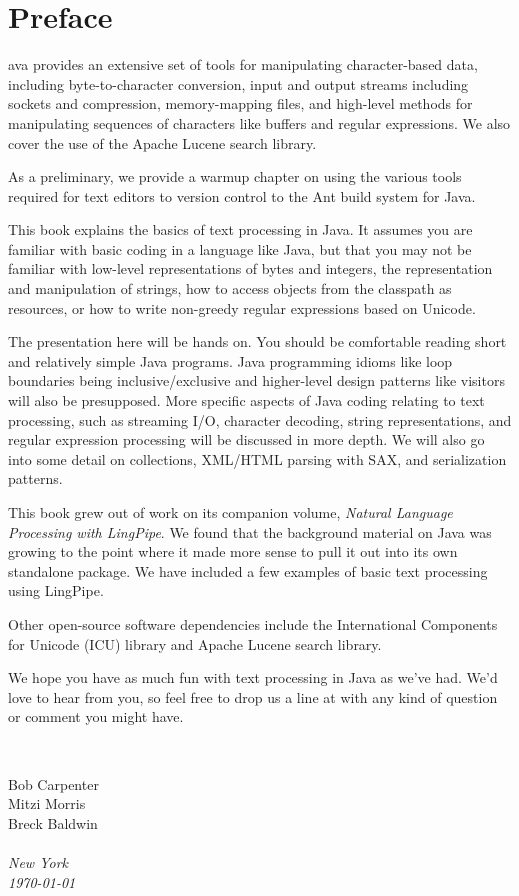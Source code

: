 \chapter*{Preface}
\pagestyle{fancy}%

ava provides an extensive set of tools for manipulating
character-based data, including byte-to-character conversion, input
and output streams including sockets and compression, memory-mapping
files, and high-level methods for manipulating sequences of characters
like buffers and regular expressions.  We also cover the use of the
Apache Lucene search library.

As a preliminary, we provide a warmup chapter on using the various
tools required for text editors to version control to the Ant build
system for Java.  

This book explains the basics of text processing in Java.  It 
assumes you are familiar with basic coding in a language like
Java, but that you may not be familiar with low-level representations
of bytes and integers, the representation and manipulation of
strings, how to access objects from the classpath as resources,
or how to write non-greedy regular expressions based on Unicode.

The presentation here will be hands on.  You should be comfortable
reading short and relatively simple Java programs.  Java programming idioms
like loop boundaries being inclusive/exclusive and higher-level design
patterns like visitors will also be presupposed.  More specific
aspects of Java coding relating to text processing, such as streaming
I/O, character decoding, string representations, and regular
expression processing will be discussed in more depth.  We will also
go into some detail on collections, XML/HTML parsing with SAX, and
serialization patterns.

This book grew out of work on its companion volume, {\it Natural
Language Processing with LingPipe}.  We found that the background material
on Java was growing to the point where it made more sense to pull it
out into its own standalone package.  We have included a few examples
of basic text processing using LingPipe. 

Other open-source software dependencies include the International
Components for Unicode (ICU) library and Apache Lucene search library.

We hope you have as much fun with text processing in Java as we've
had.  We'd love to hear from you, so feel free to drop us a line at
 with any kind of question or comment you
might have.

\vspace*{0.125in}

\newlength{\sigWidth}
\mbox{ }
\hfill
\parbox{\sigWidth}{
Bob Carpenter
\\[2pt]
Mitzi Morris
\\[2pt]
Breck Baldwin
\\[2pt]\small
\\
\it New York
\\
\today}

